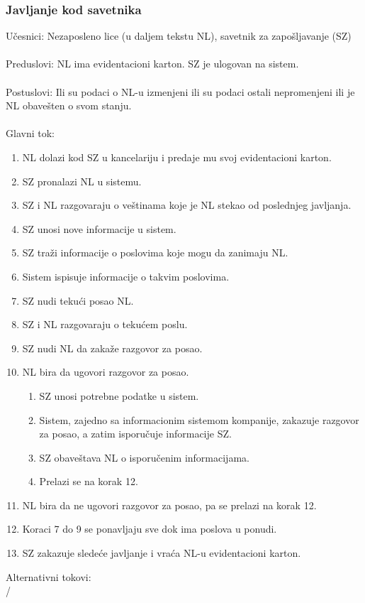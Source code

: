 \subsubsection{Javljanje kod savetnika}
\label{su: javljanje kod savetnika}

\noindent U\v cesnici: Nezaposleno lice (u daljem tekstu NL), savetnik za zapo\v sljavanje (SZ)
\\
\\ Preduslovi: NL ima evidentacioni karton. SZ je ulogovan na sistem. 
\\
\\ Postuslovi: Ili su podaci o NL-u izmenjeni ili su podaci ostali nepromenjeni ili je NL obave\v sten o svom stanju.
\\ 
\\ Glavni tok:
\begin{enumerate}
	\item NL dolazi kod SZ u kancelariju i predaje mu svoj evidentacioni karton.
	\item SZ pronalazi NL u sistemu.
	\item SZ i NL razgovaraju o ve\v stinama koje je NL stekao od poslednjeg javljanja.
	\item SZ unosi nove informacije u sistem.
	\item SZ tra\v zi informacije o poslovima koje mogu da zanimaju NL.
	\item Sistem ispisuje informacije o takvim poslovima. 
	\item SZ nudi teku\' ci posao NL.
	\item SZ i NL razgovaraju o teku\' cem poslu.
	\item SZ nudi NL da zaka\v ze razgovor za posao.
	\item NL bira da ugovori razgovor za posao.
	\begin{enumerate}
		\item SZ unosi potrebne podatke u sistem.
		\item Sistem, zajedno sa informacionim sistemom kompanije, zakazuje razgovor za posao, a zatim isporu\v cuje informacije SZ.
		\item SZ obave\v stava NL o isporu\v cenim informacijama.
		\item Prelazi se na korak 12.
	\end{enumerate}
	\item NL bira da ne ugovori razgovor za posao, pa se prelazi na korak 12.
	\item Koraci 7 do 9 se ponavljaju sve dok ima poslova u ponudi.
	\item SZ zakazuje slede\' ce javljanje i vra\' ca NL-u evidentacioni karton.
\end{enumerate}

\noindent Alternativni tokovi: 
\\/